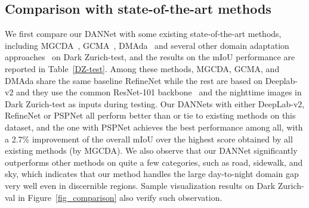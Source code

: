 \documentclass[final]{cvpr}
\begin{document}
\subsection{Comparison with state-of-the-art methods}

 \hspace{0.2cm}
We first compare our DANNet with some existing state-of-the-art methods, including MGCDA~\cite{sakaridis2020map}, GCMA~\cite{sakaridis2019guided}, DMAda~\cite{dai2018dark} and several other domain adaptation approaches~\cite{tsai2018learning,vu2019advent,li2019bidirectional} on Dark Zurich-test, and 
the results on the mIoU performance are reported in Table~\ref{DZ-test}.
Among these methods, MGCDA, GCMA, and DMAda share the same baseline RefineNet while the rest are based on Deeplab-v2 and they use the common ResNet-101 backbone~\cite{he2016deep} and the nighttime images in Dark Zurich-test as inputs during testing. 
Our DANNets with either DeepLab-v2, RefineNet or PSPNet all perform better than or tie to existing methods on this dataset, and the one with PSPNet
achieves the best performance among all, with a  2.7\% improvement of the overall mIoU over the highest  score obtained by all existing methods (by MGCDA).
We also observe that our DANNet significantly outperforms other methods on quite a few categories, such as road, sidewalk, and sky, which indicates that our method handles the large day-to-night domain gap very well even in discernible regions. 
Sample visualization results on Dark Zurich-val in Figure~\ref{fig_comparison} also verify such observation.
\end{document}

